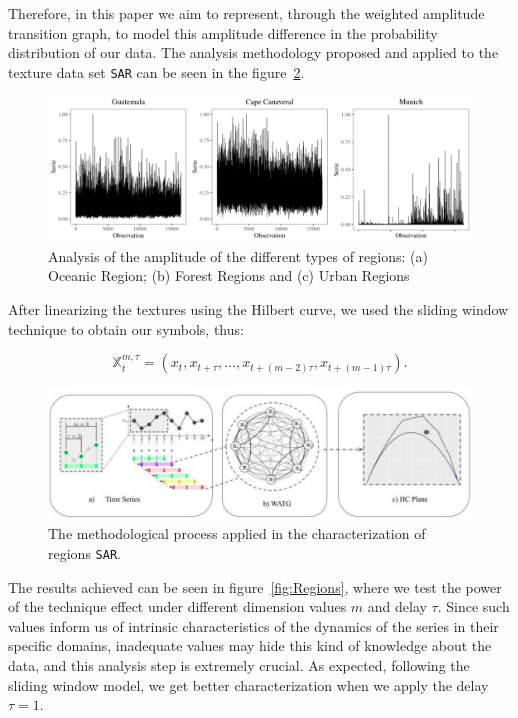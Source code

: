 \documentclass{isprs}
\begin{document}
Therefore, in this paper we aim to represent, through the weighted amplitude transition graph, to model this amplitude difference in the probability distribution of our data.
The analysis methodology proposed and applied to the texture data set \texttt{SAR} can be seen in the figure~\ref{fig:WATG}.
	
\begin{figure}[hbt]
	\includegraphics[scale = 0.28]{Figures/SAR_signal.pdf}
	\caption{Analysis of the amplitude of the different types of regions: (a) Oceanic Region; (b) Forest Regions and (c) Urban Regions}
	\label{fig:AmplitudeSAR}
\end{figure}
	
After linearizing the textures using the Hilbert curve, we used the sliding window technique to obtain our symbols, thus:

\begin{equation}
	\mathbb{X}_t^{m,\tau} = (x_{t}, x_{t+\tau},\ldots, x_{t+(m-2)\tau} ,x_{t+(m-1)\tau}).
\end{equation}
	
\begin{figure}[hbt]
	\centering
	\includegraphics[scale = 0.25]{Figures/WATG.pdf}
	\caption{The methodological process applied in the characterization of regions \texttt{SAR}.}
	\label{fig:WATG}
\end{figure}
	
The results achieved can be seen in figure~\ref{fig:Regions}, where we test the power of the technique effect under different dimension values $m$ and delay $\tau$.
Since such values inform us of intrinsic characteristics of the dynamics of the series in their specific domains, inadequate values may hide this kind of knowledge about the data, and this analysis step is extremely crucial.
As expected, following the sliding window model, we get better characterization when we apply the delay $\tau = 1$.
\end{document}
